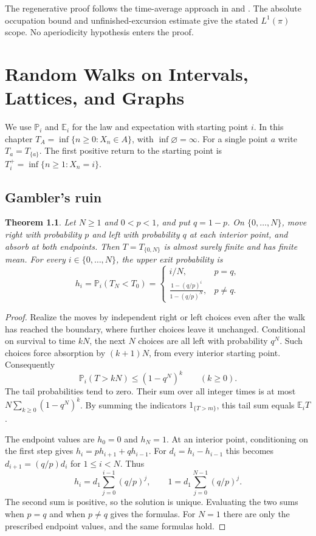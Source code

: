 \documentclass[11pt,oneside,openany]{book}
\theoremstyle{plain}
\newtheorem{theorem}{Theorem}[chapter]
\theoremstyle{definition}
\theoremstyle{remark}
\begin{document}
The regenerative proof follows the time-average approach in
\cite[Section 1.10]{Norris} and \cite[Section 5.7]{Durrett}.
The absolute occupation bound and unfinished-excursion estimate
give the stated \(L^1(\pi)\) scope. No aperiodicity hypothesis
enters the proof.
\chapter[Random Walks]{Random Walks on Intervals, Lattices, and Graphs}

We use \(\mathbb P_i\) and \(\mathbb E_i\) for the law and expectation
with starting point \(i\). In this chapter
\(T_A=\inf\{n\geq 0:X_n\in A\}\), with \(\inf\varnothing=\infty\).
For a single point \(a\) write \(T_a=T_{\{a\}}\).
The first positive return to the starting point is
\(T_i^+=\inf\{n\geq 1:X_n=i\}\).

\section{Gambler's ruin}\label{p207:W20}

\begin{theorem}\label{p207:thm:ruin}
Let \(N\geq 1\) and \(0<p<1\), and put \(q=1-p\).
On \(\{0,\ldots,N\}\), move right with probability \(p\) and left with
probability \(q\) at each interior point, and absorb at both endpoints.
Then \(T=T_{\{0,N\}}\) is almost surely finite and has finite mean.
For every \(i\in\{0,\ldots,N\}\), the upper exit probability is
\[
 h_i=\mathbb P_i(T_N<T_0)=
 \begin{cases}
  i/N, & p=q,\\[2pt]
  \displaystyle\frac{1-(q/p)^i}{1-(q/p)^N}, & p\ne q .
 \end{cases}
\]
\end{theorem}

\begin{proof}
Realize the moves by independent right or left choices even after the
walk has reached the boundary, where further choices leave it unchanged.
Conditional on survival to time \(kN\), the next \(N\) choices are all
left with probability \(q^N\). Such choices force absorption by
\((k+1)N\), from every interior starting point. Consequently
\[
 \mathbb P_i(T>kN)\leq (1-q^N)^k\qquad(k\geq 0).
\]
The tail probabilities tend to zero. Their sum over all integer times
is at most \(N\sum_{k\geq 0}(1-q^N)^k\). By summing the indicators
\(1_{\{T>m\}}\), this tail sum equals \(\mathbb E_i T\).

The endpoint values are \(h_0=0\) and \(h_N=1\).
At an interior point, conditioning on the first step gives
\(h_i=p h_{i+1}+q h_{i-1}\). For \(d_i=h_i-h_{i-1}\) this becomes
\(d_{i+1}=(q/p)d_i\) for \(1\leq i<N\). Thus
\[
 h_i=d_1\sum_{j=0}^{i-1}(q/p)^j,\qquad
 1=d_1\sum_{j=0}^{N-1}(q/p)^j.
\]
The second sum is positive, so the solution is unique. Evaluating the
two sums when \(p=q\) and when \(p\ne q\) gives the formulas.
For \(N=1\) there are only the prescribed endpoint values, and the
same formulas hold.
\end{proof}
\end{document}
